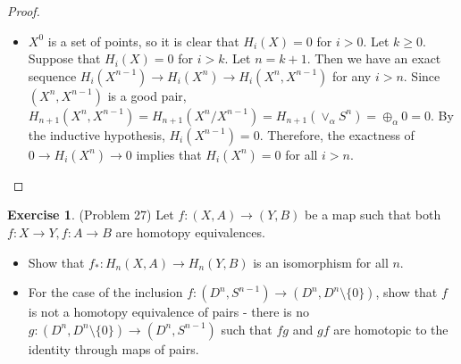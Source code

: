\documentclass[12pt, psamsfonts]{amsart}
\theoremstyle{definition}
\newtheorem*{exer}{Exercise}
\theoremstyle{remark}
\numberwithin{equation}{section}
\begin{document}
\begin{proof}
$ $
  \begin{itemize}
    \item
      $X^0$ is a set of points, so it is clear that $H_i(X) = 0$ for $i > 0$.
      Let $k \geq 0$.
      Suppose that $H_i(X) = 0$ for $i > k$.
      Let $n = k + 1$.
      Then we have an exact sequence $H_{i}(X^{n - 1}) \rightarrow H_{i}(X^n) \rightarrow H_{i}(X^n, X^{n - 1})$ for any $i > n$.
      Since $(X^n, X^{n - 1})$ is a good pair, $H_{n + 1}(X^n, X^{n - 1}) = H_{n + 1}(X^n / X^{n - 1}) = H_{n + 1}(\vee_{\alpha} S^n) = \oplus_{\alpha} 0 = 0$.
      By the inductive hypothesis, $H_i(X^{n - 1}) = 0$.
      Therefore, the exactness of $0 \rightarrow H_i(X^n) \rightarrow 0$ implies that $H_i(X^n) = 0$ for all $i > n$.
  \end{itemize}
\end{proof}

\begin{exer}{(Problem 27)}
  Let $f:(X, A) \rightarrow (Y, B)$ be a map such that both $f: X \rightarrow Y, f:A \rightarrow B$ are homotopy equivalences.

  \begin{itemize}
    \item
      Show that $f_* : H_n(X, A) \rightarrow  H_n(Y, B)$ is an isomorphism for all $n$.
    \item
      For the case of the inclusion $f:(D^n, S^{n - 1}) \rightarrow (D^n, D^n \setminus \{ 0 \})$, show that $f$ is not a homotopy equivalence of pairs -
      there is no $g: (D^n, D^n \setminus \{ 0 \}) \rightarrow (D^n, S^{n - 1})$ such that $fg$ and $gf$ are homotopic to the identity through maps of pairs.
  \end{itemize}
\end{exer}
\end{document}
